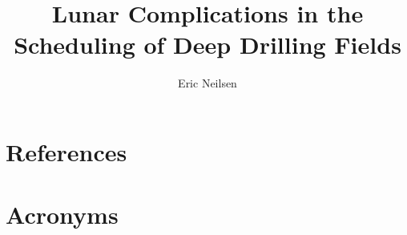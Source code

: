 \documentclass[DM,authoryear,toc]{lsstdoc}
\title{Lunar Complications in the Scheduling of Deep Drilling Fields}
\author{%
Eric Neilsen
}
\date{\vcsDate}
\begin{document}
\maketitle


\appendix
\section{References} \label{sec:bib}
\renewcommand{\refname}{} %


\section{Acronyms} \label{sec:acronyms}

\end{document}
